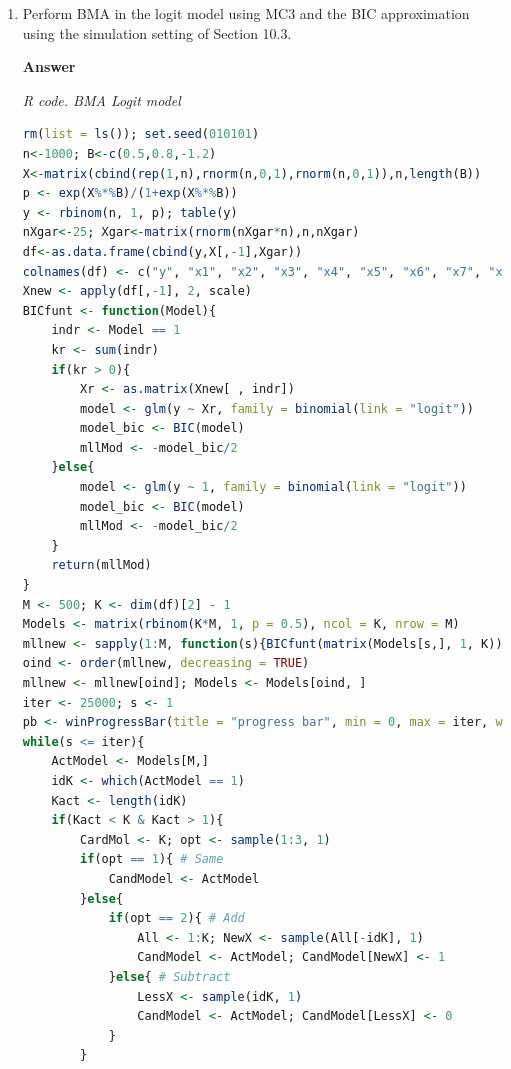 \begin{enumerate}[leftmargin=*]
We found that the best model, for which the PMP is equal to 27\%, has as regressors age, squared age, age at first birth, use birth control, husband's years of education, woman's years of education, and living in an urban area.
The first five variables have PIPs equal to 100. For instance, we found that women using birth control have approximately 15\% fewer children on average than women who are not using birth control. 

\item Perform BMA in the logit model using MC3 and the BIC approximation using the simulation setting of Section 10.3.   

\textbf{Answer}

\begin{tcolorbox}[enhanced,width=4.67in,center upper,
	fontupper=\large\bfseries,drop shadow southwest,sharp corners]
	\textit{R code. BMA Logit model}
	\begin{VF}
		\begin{lstlisting}[language=R]
rm(list = ls()); set.seed(010101)
n<-1000; B<-c(0.5,0.8,-1.2)
X<-matrix(cbind(rep(1,n),rnorm(n,0,1),rnorm(n,0,1)),n,length(B))
p <- exp(X%*%B)/(1+exp(X%*%B))
y <- rbinom(n, 1, p); table(y)
nXgar<-25; Xgar<-matrix(rnorm(nXgar*n),n,nXgar)
df<-as.data.frame(cbind(y,X[,-1],Xgar))
colnames(df) <- c("y", "x1", "x2", "x3", "x4", "x5", "x6", "x7", "x8", "x9", "x10", "x11", "x12", "x13", "x14", "x15", "x16", "x17", "x18", "x19", "x20", "x21", "x22", "x23", "x24", "x25", "x26", "x27")
Xnew <- apply(df[,-1], 2, scale)
BICfunt <- function(Model){
	indr <- Model == 1
	kr <- sum(indr)
	if(kr > 0){
		Xr <- as.matrix(Xnew[ , indr])
		model <- glm(y ~ Xr, family = binomial(link = "logit"))
		model_bic <- BIC(model)
		mllMod <- -model_bic/2
	}else{
		model <- glm(y ~ 1, family = binomial(link = "logit"))
		model_bic <- BIC(model)
		mllMod <- -model_bic/2
	}
	return(mllMod)
}
M <- 500; K <- dim(df)[2] - 1
Models <- matrix(rbinom(K*M, 1, p = 0.5), ncol = K, nrow = M)
mllnew <- sapply(1:M, function(s){BICfunt(matrix(Models[s,], 1, K))})
oind <- order(mllnew, decreasing = TRUE)
mllnew <- mllnew[oind]; Models <- Models[oind, ]
iter <- 25000; s <- 1
pb <- winProgressBar(title = "progress bar", min = 0, max = iter, width = 300)
while(s <= iter){
	ActModel <- Models[M,]
	idK <- which(ActModel == 1)
	Kact <- length(idK)
	if(Kact < K & Kact > 1){
		CardMol <- K; opt <- sample(1:3, 1)
		if(opt == 1){ # Same
			CandModel <- ActModel
		}else{
			if(opt == 2){ # Add
				All <- 1:K; NewX <- sample(All[-idK], 1)
				CandModel <- ActModel; CandModel[NewX] <- 1
			}else{ # Subtract
				LessX <- sample(idK, 1)
				CandModel <- ActModel; CandModel[LessX] <- 0
			}
		}
\end{lstlisting}
	\end{VF}
\end{tcolorbox} 



\end{enumerate}
